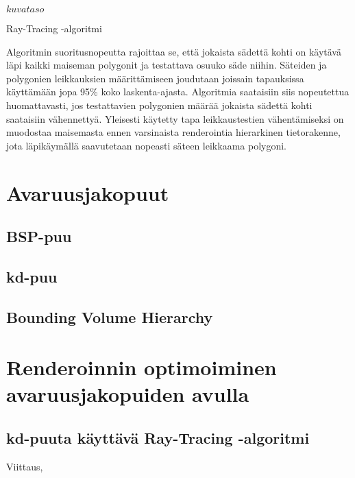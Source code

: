 \documentclass[a4paper,12pt, titlepage]{article}
\theoremstyle{break}
\begin{document}
\begin{algorithm}
\KwRet $kuvataso$
\caption{Ray-Tracing -algoritmi}\label{algo_raytrace}
\end{algorithm}



Algoritmin suoritusnopeutta rajoittaa se, että jokaista sädettä kohti on käytävä läpi kaikki maiseman polygonit ja testattava osuuko säde niihin. Säteiden ja polygonien leikkauksien määrittämiseen joudutaan joissain tapauksissa käyttämään jopa 95\% koko laskenta-ajasta.\cite{whitted} Algoritmia saataisiin siis nopeutettua huomattavasti, jos testattavien polygonien määrää jokaista sädettä kohti saataisiin vähennettyä. Yleisesti käytetty tapa leikkaustestien vähentämiseksi on muodostaa maisemasta ennen varsinaista renderointia hierarkinen tietorakenne, jota läpikäymällä saavutetaan nopeasti säteen leikkaama polygoni.\cite{rubin}

\section{Avaruusjakopuut}
\subsection{BSP-puu}
\subsection{kd-puu}
\subsection{Bounding Volume Hierarchy}

\section{Renderoinnin optimoiminen avaruusjakopuiden avulla}
\subsection{kd-puuta käyttävä Ray-Tracing -algoritmi}
Viittaus\cite{ranta},\cite{samet}\cite{havran}

\newpage

\listofalgorithms
\end{document}
